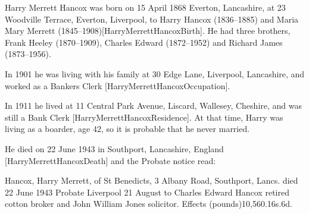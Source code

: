 
Harry Merrett Hancox was born on 15 April 1868 	Everton, Lancashire, at 23 Woodville Terrace, Everton, Liverpool, to Harry Hancox (1836--1885) and Maria Mary Merrett (1845--1908)[HarryMerrettHancoxBirth].  He had three brothers, Frank Heeley (1870--1909), Charles Edward (1872--1952) and Richard James (1873--1956).

In 1901 he was living with his family at 30 Edge Lane, Liverpool, Lancashire, and worked as a Bankers Clerk [HarryMerrettHancoxOccupation].

In 1911 he lived at 11 Central Park Avenue, Liscard, Wallesey, Cheshire, and was still a Bank Clerk [HarryMerrettHancoxResidence]. At that time, Harry was living as a boarder, age 42, so it is probable that he never married. 

He died on 22 June 1943 in Southport, Lancashire, England [HarryMerrettHancoxDeath] and the Probate notice read:

Hancox, Harry Merrett, of St Benedicts, 3 Albany Road, Southport, Lancs. died 22 June 1943 Probate Liverpool 21 August to Charles Edward Hancox retired cotton broker and John William Jones solicitor. Effects (pounds)10,560.16s.6d.


